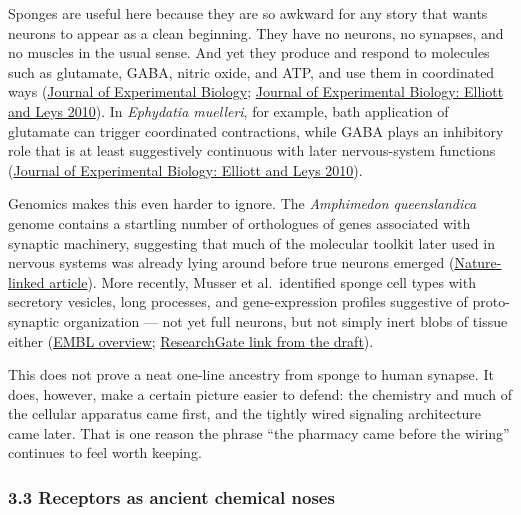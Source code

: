 Sponges are useful here because they are so awkward for any story that wants neurons to appear as a clean beginning. They have no neurons, no synapses, and no muscles in the usual sense. And yet they produce and respond to molecules such as glutamate, GABA, nitric oxide, and ATP, and use them in coordinated ways (\href{https://journals.biologists.com/jeb/article/228/3/JEB248010/365649/ATP-and-glutamate-coordinate-contractions-in-the}{Journal of Experimental Biology}; \href{https://journals.biologists.com/jeb/article/213/13/2310/34070/Evidence-for-glutamate-GABA-and-NO-in-coordinating}{Journal of Experimental Biology: Elliott and Leys 2010}). In \emph{Ephydatia muelleri}, for example, bath application of glutamate can trigger coordinated contractions, while GABA plays an inhibitory role that is at least suggestively continuous with later nervous-system functions (\href{https://journals.biologists.com/jeb/article/213/13/2310/34070/Evidence-for-glutamate-GABA-and-NO-in-coordinating}{Journal of Experimental Biology: Elliott and Leys 2010}).

Genomics makes this even harder to ignore. The \emph{Amphimedon queenslandica} genome contains a startling number of orthologues of genes associated with synaptic machinery, suggesting that much of the molecular toolkit later used in nervous systems was already lying around before true neurons emerged (\href{https://www.nature.com/articles/s41598-019-51282-x}{Nature-linked article}). More recently, Musser et al.~identified sponge cell types with secretory vesicles, long processes, and gene-expression profiles suggestive of proto-synaptic organization --- not yet full neurons, but not simply inert blobs of tissue either (\href{https://www.embl.org/ells/2023/11/27/making-sense-of-our-brain-in-the-light-of-evolution/}{EMBL overview}; \href{https://www.researchgate.net/publication/350119637_Encoding_innate_ability_through_a_genomic_bottleneck}{ResearchGate link from the draft}).

This does not prove a neat one-line ancestry from sponge to human synapse. It does, however, make a certain picture easier to defend: the chemistry and much of the cellular apparatus came first, and the tightly wired signaling architecture came later. That is one reason the phrase ``the pharmacy came before the wiring'' continues to feel worth keeping.

\subsubsection{3.3 Receptors as ancient chemical noses}\label{03_it_started-receptors-as-ancient-chemical-noses}

